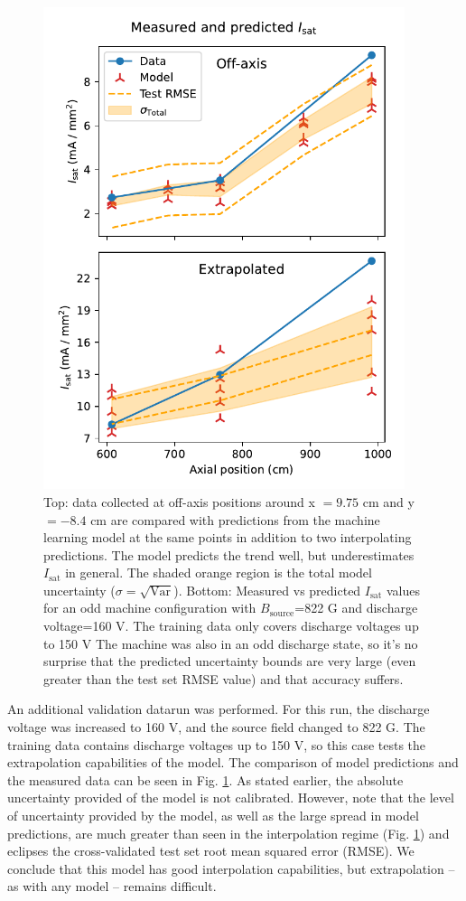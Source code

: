 \begin{figure}
	\centering
	\includegraphics[width=300pt]{figures/measured-vs-predicted_off-axis_160V}
	\caption[size=12]{\label{fig:measured-vs-predicted}Top: data collected at off-axis positions around x $=9.75$ cm and y $=-8.4$ cm are compared with predictions from the machine learning model at the same points in addition to two interpolating predictions. The model predicts the trend well, but underestimates $I_\text{sat}$ in general. The shaded orange region is the total model uncertainty ($\sigma = \sqrt{\text{Var}}$). Bottom: Measured vs predicted $I_\text{sat}$ values for an odd machine configuration with $B_\text{source}$=822 G and discharge voltage=160 V. The training data only covers discharge voltages up to 150 V The machine was also in an odd discharge state, so it's no surprise that the predicted uncertainty bounds are very large (even greater than the test set RMSE value) and that accuracy suffers.}
\end{figure}

An additional validation datarun was performed. For this run, the discharge voltage was increased to 160 V, and the source field changed to 822 G. The training data contains discharge voltages up to 150 V, so this case tests the extrapolation capabilities of the model. The comparison of model predictions and the measured data can be seen in Fig. \ref{fig:measured-vs-predicted}. As stated earlier, the absolute uncertainty provided of the model is not calibrated. However, note that the level of uncertainty provided by the model, as well as the large spread in model predictions, are much greater than seen in the interpolation regime (Fig. \ref{fig:measured-vs-predicted}) and eclipses the cross-validated test set root mean squared error (RMSE). We conclude that this model has good interpolation capabilities, but extrapolation -- as with any model -- remains difficult.

